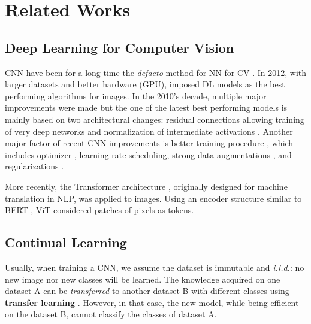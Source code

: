 \chapter{Related Works}
\label{chapter:related}

{}


\section{Deep Learning for Computer Vision}

\ac{CNN} have been for a long-time the \textit{defacto} method for \acs{NN} for \ac{CV}
\citep{fukushima1980neocognitron,lecun1999lenet}. In 2012, with larger datasets and better hardware
(\ie \acs{GPU}), \cite{krizhevsky2012alexnet} imposed \ac{DL} models as the best performing
algorithms for images. In the 2010's decade, multiple major improvements were made but the one of
the latest best performing models \citep{tan2019efficientnet} is mainly based on two architectural changes:
residual connections allowing training of very deep networks \citep{he2016resnet} and normalization
of intermediate activations \citep{ioffe2015batchnorm}. Another major factor of recent \ac{CNN}
improvements is better training procedure \citep{wightman2019resnetstrikesback}, which includes
optimizer \citep{kingma2014adam}, learning rate scheduling, strong data augmentations
\citep{muller2021trivialaugment,hingyi2018mixup,zhong2017erasing}, and regularizations
\citep{gal2016dropout,gao2016stochasticdepth}.

More recently, the Transformer architecture \citep{vaswani2017transformer}, originally designed for
machine translation in \ac{NLP}, was applied to images. Using an encoder structure similar to BERT
\citep{devlin2018bert}, ViT \citep{dosovitskiy2020vit} considered patches of pixels as tokens.

\section{Continual Learning}

Usually, when training a \ac{CNN}, we assume the dataset is immutable and \textit{i.i.d.}: no new
image nor new classes will be learned. The knowledge acquired on one dataset A can be
\textit{transferred} to another dataset B with different classes using \textbf{transfer learning}
\citep{razavian2014transferlearning}. However, in that case, the new model, while being efficient on
the dataset B, cannot classify the classes of dataset A.

